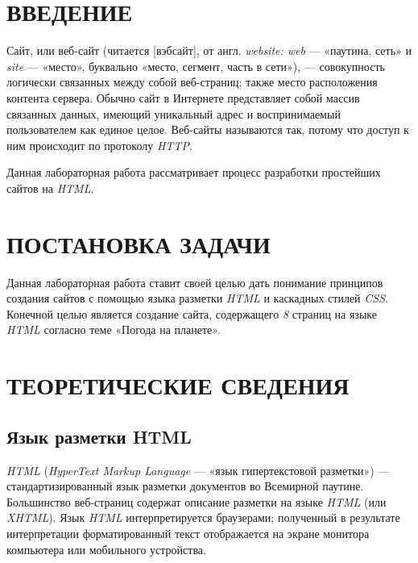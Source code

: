 \documentclass[a4paper,hidelinks,14pt]{extarticle}
\begin{document}


\section*{ВВЕДЕНИЕ}


Сайт, или веб-сайт (читается [вэбсайт], от англ. \textit{website: web} — «паутина, сеть» и \textit{site} — «место», буквально «место, сегмент, часть в сети»), — совокупность логически связанных между собой веб-страниц; также место расположения контента сервера. Обычно сайт в Интернете представляет собой массив связанных данных, имеющий уникальный адрес и воспринимаемый пользователем как единое целое. Веб-сайты называются так, потому что доступ к ним происходит по протоколу \textit{HTTP}.

Данная лабораторная работа рассматривает процесс разработки простейших сайтов на \textit{HTML}.



\section[Постановка задачи]{ПОСТАНОВКА ЗАДАЧИ}
Данная лабораторная работа ставит своей целью дать понимание принципов создания сайтов с помощью языка разметки \textit{HTML} и каскадных стилей \textit{CSS}. Конечной целью является создание сайта, содержащего \textit{8} страниц на языке \textit{HTML} согласно теме  «Погода на планете».


\section[Теоретические сведения]{ТЕОРЕТИЧЕСКИЕ СВЕДЕНИЯ}

\subsection{Язык разметки HTML}
\textit{HTML} (\textit{HyperText Markup Language} — «язык гипертекстовой разметки») — стандартизированный язык разметки документов во Всемирной паутине. Большинство веб-страниц содержат описание разметки на языке \textit{HTML} (или \textit{XHTML}). Язык \textit{HTML} интерпретируется браузерами; полученный в результате интерпретации форматированный текст отображается на экране монитора компьютера или мобильного устройства.
\end{document}
